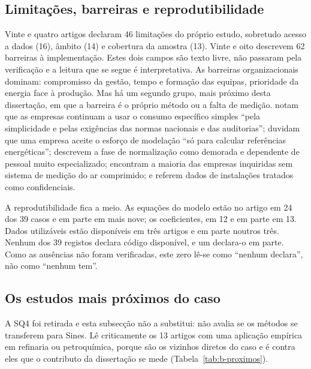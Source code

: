 \subsection{Limitações, barreiras e reprodutibilidade}

Vinte e quatro artigos declaram 46 limitações do próprio estudo, sobretudo
acesso a dados (16), âmbito (14) e cobertura da amostra (13). Vinte e oito
descrevem 62 barreiras à implementação. Estes dois campos são texto livre,
não passaram pela verificação e a leitura que se segue é interpretativa. As
barreiras organizacionais dominam: compromisso da gestão, tempo e formação
das equipas, prioridade da energia face à produção. Mas há um segundo grupo,
mais próximo desta dissertação, em que a barreira é o próprio método ou a
falta de medição. \textcite{Hamedi2019} notam que as empresas continuam a
usar o consumo específico simples ``pela simplicidade e pelas exigências das
normas nacionais e das auditorias''; \textcite{Beisheim2020} duvidam que uma
empresa aceite o esforço de modelação ``só para calcular referências
energéticas''; \textcite{Bruni2021} descrevem a fase de normalização como
demorada e dependente de pessoal muito especializado; \textcite{Bonfa2017}
encontram a maioria das empresas inquiridas sem sistema de medição do ar
comprimido; e \textcite{Boyd2013} referem dados de instalações tratados como
confidenciais.

A reprodutibilidade fica a meio. As equações do modelo estão no artigo em 24
dos 39 casos e em parte em mais nove; os coeficientes, em 12 e em parte em
13. Dados utilizáveis estão disponíveis em três artigos e em parte noutros
três. Nenhum dos 39 registos declara código disponível, e um declara-o em
parte. Como as ausências não foram verificadas, este zero lê-se como
``nenhum declara'', não como ``nenhum tem''.

\subsection{Os estudos mais próximos do caso}
\label{sec:corpus-b-proximos}

A SQ4 foi retirada e esta subsecção não a substitui: não avalia se os
métodos se transferem para Sines. Lê criticamente os 13 artigos com uma
aplicação empírica em refinaria ou petroquímica, porque são os vizinhos
diretos do caso e é contra eles que o contributo da dissertação se mede
(Tabela~\ref{tab:b-proximos}).

